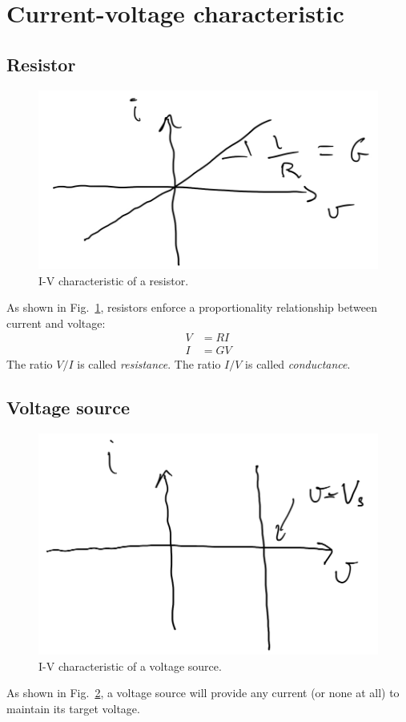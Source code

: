 \section{Current-voltage characteristic}

\subsection{Resistor}
\begin{figure}
  \centering
  \includegraphics[width=0.5\linewidth]{figures/IV-resistor}
  \caption{I-V characteristic of a resistor.}
  \label{figure:circuit-review:IV-resistor}
\end{figure}
As shown in Fig.~\ref{figure:circuit-review:IV-resistor},
resistors enforce a proportionality relationship between
current and voltage:
\begin{align}
  V &= RI\\
  I &= GV
\end{align}
The ratio \(V/I\) is called \emph{resistance}.
The ratio \(I/V\) is called \emph{conductance}.

\subsection{Voltage source}
\begin{figure}
  \centering
  \includegraphics[width=0.5\linewidth]{figures/IV-voltage-source}
  \caption{I-V characteristic of a voltage source.}
  \label{figure:circuit-review:IV-VS}
\end{figure}
As shown in Fig.~\ref{figure:circuit-review:IV-VS},
a voltage source will provide any current (or none at all) to
maintain its target voltage.

